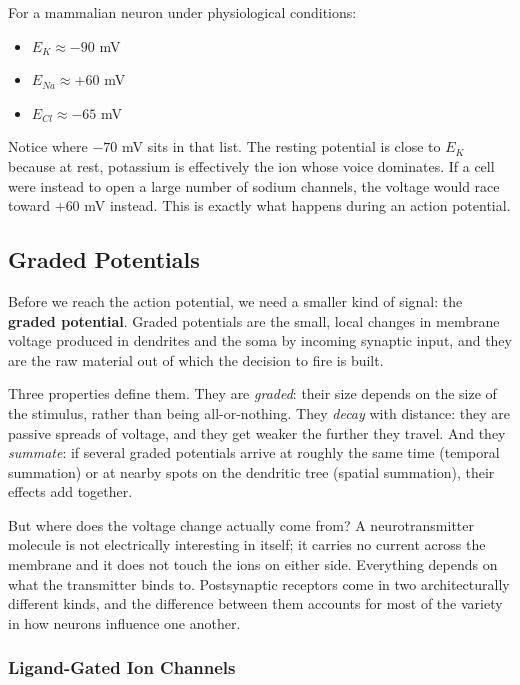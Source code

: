 \documentclass[11pt]{article}
\begin{document}
For a mammalian neuron under physiological conditions:

\begin{itemize}
    \item $E_K \approx -90$ mV
    \item $E_{Na} \approx +60$ mV
    \item $E_{Cl} \approx -65$ mV
\end{itemize}

Notice where $-70$ mV sits in that list. The resting potential is close to $E_K$ because at rest, potassium is effectively the ion whose voice dominates. If a cell were instead to open a large number of sodium channels, the voltage would race toward $+60$ mV instead. This is exactly what happens during an action potential.

\subsection{Graded Potentials}

Before we reach the action potential, we need a smaller kind of signal: the \textbf{graded potential}. Graded potentials are the small, local changes in membrane voltage produced in dendrites and the soma by incoming synaptic input, and they are the raw material out of which the decision to fire is built.

Three properties define them. They are \textit{graded}: their size depends on the size of the stimulus, rather than being all-or-nothing. They \textit{decay} with distance: they are passive spreads of voltage, and they get weaker the further they travel. And they \textit{summate}: if several graded potentials arrive at roughly the same time (temporal summation) or at nearby spots on the dendritic tree (spatial summation), their effects add together.

But where does the voltage change actually come from? A neurotransmitter molecule is not electrically interesting in itself; it carries no current across the membrane and it does not touch the ions on either side. Everything depends on what the transmitter binds to. Postsynaptic receptors come in two architecturally different kinds, and the difference between them accounts for most of the variety in how neurons influence one another.

\subsubsection{Ligand-Gated Ion Channels}
\end{document}
